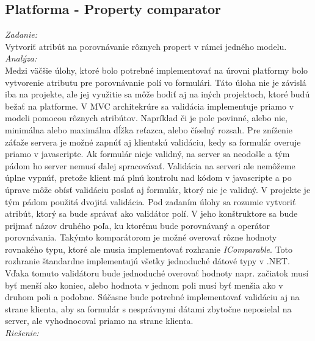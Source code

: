 \documentclass[11pt, oneside]{report}
\begin{document}
\subsection{Platforma - Property  comparator}\label{sssec:num1}
\textit{Zadanie:}\\
Vytvoriť atribút na porovnávanie rôznych propert v rámci jedného modelu.
\\\textit{Analýza:}\\
Medzi väčšie  úlohy, ktoré  bolo potrebné implementovať na úrovni platformy bolo vytvorenie atributu pre porovnávanie polí vo formulári. Táto úloha nie je  závislá iba na projekte, ale  jej využitie sa môže hodiť aj na iných projektoch, ktoré budú bežať na platforme. V MVC architekrúre sa validácia implementuje priamo v modeli pomocou rôznych atribútov. Napríklad či je pole povinné, alebo nie, minimálna alebo maximálna dĺžka reťazca, alebo číselný rozsah. Pre zníženie záťaže servera je možné zapnúť aj klientskú validáciu, kedy sa formulár overuje priamo v javascripte. Ak formulár nieje  validný, na server sa neodošle a tým pádom ho server nemusí ďalej spracovávať. Validácia  na serveri ale nemôžeme úplne vypnúť, pretože klient  má plnú kontrolu nad kódom v javascripte a po  úprave môže obísť validáciu poslať aj formulár, ktorý nie je validný. V projekte je tým pádom použitá dvojitá validácia. Pod zadaním úlohy sa rozumie vytvoriť atribút, ktorý sa bude správať ako validátor polí. V jeho konštruktore  sa bude prijmať názov druhého poľa, ku ktorému bude porovnávaný a operátor porovnávania. Takýmto komparátorom je možné overovať rôzne hodnoty rovnakého typu, ktoré ale musia implementovať rozhranie \textit{IComparable}. Toto rozhranie štandardne implementujú všetky jednoduché dátové typy v .NET.  Vďaka tomuto validátoru bude jednoduché overovať hodnoty napr. začiatok musí byť menší ako koniec, alebo hodnota v jednom poli musí byť menšia ako v druhom poli a podobne. Súčasne bude potrebné implementovať validáciu aj na strane klienta, aby sa  formulár s nesprávnymi dátami zbytočne neposielal na server, ale vyhodnocoval priamo  na strane klienta.
\\\textit{Riešenie:}\\
\end{document}
